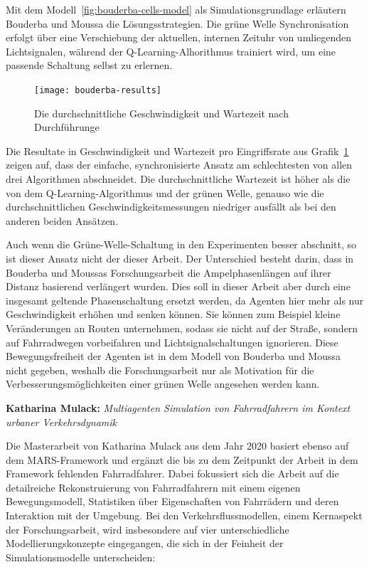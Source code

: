 Mit dem Modell~\ref{fig:bouderba-cells-model} als Simulationsgrundlage erläutern Bouderba und Moussa die Lösungsstrategien.
Die grüne Welle Synchronisation erfolgt über eine Verschiebung der aktuellen, internen Zeituhr von umliegenden Lichtsignalen, während der Q-Learning-Alhorithmus trainiert wird, um eine passende Schaltung selbst zu erlernen.

\begin{figure}[h]
    \centering
    \texttt{[image: bouderba-results]}~\caption{Die durchschnittliche Geschwindigkeit und Wartezeit nach Durchführunge~\cite{Bouderba2019}}
    \label{fig:bouderba-result-graph}
\end{figure}


Die Resultate in Geschwindigkeit und Wartezeit pro Eingriffsrate aus Grafik~\ref{fig:bouderba-result-graph} zeigen auf, dass der einfache, synchronisierte Ansatz am schlechtesten von allen drei Algorithmen abschneidet.
Die durchschnittliche Wartezeit ist höher als die von dem Q-Learning-Algorithmus und der grünen Welle, genauso wie die durchschnittlichen Geschwindigkeitsmessungen niedriger ausfällt als bei den anderen beiden Ansätzen.

Auch wenn die Grüne-Welle-Schaltung in den Experimenten besser abschnitt, so ist dieser Ansatz nicht der dieser Arbeit.
Der Unterschied besteht darin, dass in Bouderba und Moussas Forschungsarbeit die Ampelphasenlängen auf ihrer Distanz basierend verlängert wurden.
Dies soll in dieser Arbeit aber durch eine insgesamt geltende Phasenschaltung ersetzt werden, da Agenten hier mehr als nur Geschwindigkeit erhöhen und senken können.
Sie können zum Beispiel kleine Veränderungen an Routen unternehmen, sodass sie nicht auf der Straße, sondern auf Fahrradwegen vorbeifahren und Lichtsignalschaltungen ignorieren.
Diese Bewegungsfreiheit der Agenten ist in dem Modell von Bouderba und Moussa nicht gegeben, weshalb die Forschungsarbeit nur als Motivation für die Verbesserungsmöglichkeiten einer grünen Welle angesehen werden kann.


\textbf{Katharina Mulack:}
\textit{Multiagenten Simulation von Fahrradfahrern im Kontext urbaner Verkehrsdynamik}

Die Masterarbeit von Katharina Mulack aus dem Jahr 2020 basiert ebenso auf dem MARS-Framework und ergänzt die bis zu dem Zeitpunkt der Arbeit in dem Framework fehlenden Fahrradfahrer.
Dabei fokussiert sich die Arbeit auf die detailreiche Rekonstruierung von Fahrradfahrern mit einem eigenen Bewegungsmodell, Statistiken über Eigenschaften von Fahrrädern und deren Interaktion mit der Umgebung\cite{Mulack2020}.
Bei den Verkehrsflussmodellen, einem Kernaspekt der Forschungsarbeit, wird insbesondere auf vier unterschiedliche Modellierungskonzepte eingegangen, die sich in der Feinheit der Simulationsmodelle unterscheiden:

